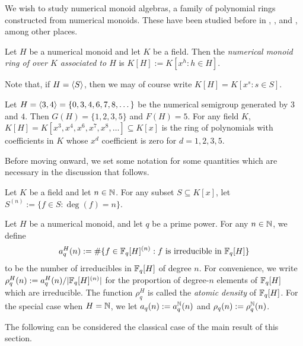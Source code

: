 We wish to study numerical monoid algebras, a family of polynomial rings constructed from numerical monoids.
These have been studied before in \cite{anderson-etal93}, \cite{and-jenk95}, and \cite{barucci06}, among other places.

\begin{defn}
	Let $H$ be a numerical monoid and let $K$ be a field.
	Then the \textit{numerical monoid ring of over $K$ associated to $H$} is $K[H] := K[x^h : h\in H]$.
	
	Note that, if $H = \langle S \rangle$, then we may of course write $K[H] = K[x^s: s\in S]$.
\end{defn}


\begin{eg}
	Let $H = \langle 3,4 \rangle = \{0,3,4,6,7,8,\dots\}$ be the numerical semigroup generated by $3$ and $4$.
	Then $G(H) = \{1,2,3,5\}$ and $F(H) = 5$.
	For any field $K$, $K[H] = K[x^3,x^4,x^6,x^7,x^8,\dots] \subseteq K[x]$ is the ring of polynomials with coefficients in $K$ whose $x^d$ coefficient is zero for $d = 1,2,3,5$.
\end{eg}

Before moving onward, we set some notation for some quantities which are necessary in the discussion that follows.

\begin{defn}
	Let $K$ be a field and let $n\in \mathbb{N}$.
	For any subset $S \subseteq K[x]$, let $S^{(n)} := \{f\in S: \deg(f) = n\}$.
	
	Let $H$ be a numerical monoid, and let $q$ be a prime power.
	For any $n\in \mathbb{N}$, we define 
	\[a_q^H(n) := \#\{f\in \mathbb{F}_q[H]^{(n)}: f \textrm{ is irreducible in } \mathbb{F}_q[H] \}\]
	to be the number of irreducibles in $\mathbb{F}_q[H]$ of degree $n$.
	For convenience, we write $\rho_q^H(n) := a_q^H(n)/|\mathbb{F}_q[H]^{(n)}|$ for the proportion of degree-$n$ elements of $\mathbb{F}_q[H]$ which are irreducible.
	The function $\rho_q^H$ is called the \textit{atomic density} of $\mathbb{F}_q[H]$.
	For the special case when $H = \mathbb{N}$, we let $a_q(n) := a_q^{\mathbb{N}}(n)$ and $\rho_q(n) := \rho_q^{\mathbb{N}}(n)$.
\end{defn}

The following can be considered the classical case of the main result of this section.

